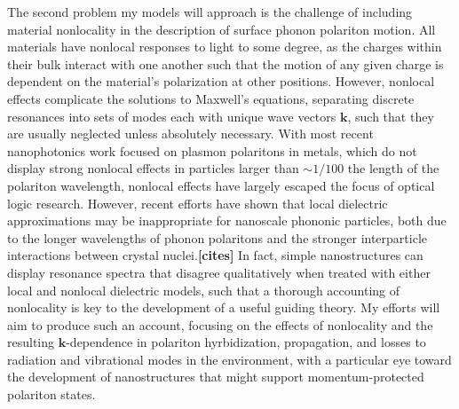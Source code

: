 \documentclass[11pt,a4paper]{article}
\begin{document}
The second problem my models will approach is the challenge of including material nonlocality in the description of surface phonon polariton motion. All materials have nonlocal responses to light to some degree, as the charges within their bulk interact with one another such that the motion of any given charge is dependent on the material's polarization at other positions. However, nonlocal effects complicate the solutions to Maxwell's equations, separating discrete resonances into sets of modes each with unique wave vectors $\mathbf{k}$, such that they are usually neglected unless absolutely necessary. With most recent nanophotonics work focused on plasmon polaritons in metals, which do not display strong nonlocal effects in particles larger than $\sim1/100$ the length of the polariton wavelength, nonlocal effects have largely escaped the focus of optical logic research. However, recent efforts have shown that local dielectric approximations may be inappropriate for nanoscale phononic particles, both due to the longer wavelengths of phonon polaritons and the stronger interparticle interactions between crystal nuclei.\textbf{[cites]} In fact, simple nanostructures can display resonance spectra that disagree qualitatively when treated with either local and nonlocal dielectric models, such that a thorough accounting of nonlocality is key to the development of a useful guiding theory. My efforts will aim to produce such an account, focusing on the effects of nonlocality and the resulting $\mathbf{k}$-dependence in polariton hyrbidization, propagation, and losses to radiation and vibrational modes in the environment, with a particular eye toward the development of nanostructures that might support momentum-protected polariton states.
\end{document}

